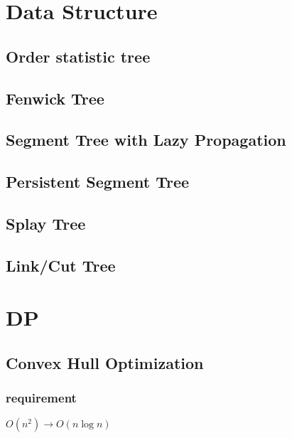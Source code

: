 \documentclass[10pt,landscape,a4paper,twocolumn]{article}
\begin{document}
\section{Data Structure}

\subsection{Order statistic tree}


\subsection{Fenwick Tree}


\subsection{Segment Tree with Lazy Propagation}


\subsection{Persistent Segment Tree}


\subsection{Splay Tree}


\subsection{Link/Cut Tree}


\section{DP}

\subsection{Convex Hull Optimization}
\subsubsection{requirement}
$O(n^{2}) \to O(n\log{n})$
\end{document}
